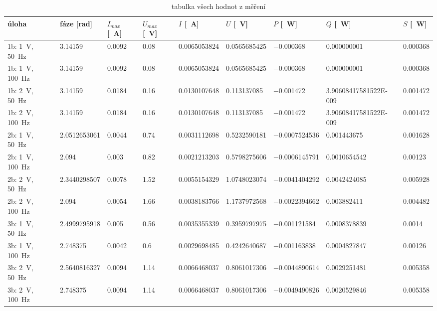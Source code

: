 \documentclass[a4paper]{article}
\begin{document}
\begin{table}[!ht]
	\centering
	\begin{tabular}{|l|l|l|l|l|l|l|l|l|}
		\hline
		úloha & fáze [rad] & $I_{max}$ [\SI{}{\ampere}] & $U_{max}$ [\SI{}{\volt}]& $I$ [\SI{}{\ampere}]& $U$ [\SI{}{\volt}]& $P$ [\SI{}{\watt}]&$ Q$ [\SI{}{\watt}]
		& $S$ [\SI{}{\watt}]\\ \hline
		1b: \SI{1}{\volt}, \SI{50}{\hertz}&\num{3.14159}&\num{0.0092}&\num{0.08}&\num{0.0065053824}&\num{0.0565685425}&\num{-0.000368}&\num{0.000000001}&\num{0.000368} \\ \hline
		1b: \SI{1}{\volt}, \SI{100}{\hertz}&\num{3.14159}&\num{0.0092}&\num{0.08}&\num{0.0065053824}&\num{0.0565685425}&\num{-0.000368}&\num{0.000000001}&\num{0.000368} \\ \hline
		1b: \SI{2}{\volt}, \SI{50}{\hertz}&\num{3.14159}&\num{0.0184}&\num{0.16}&\num{0.0130107648}&\num{0.113137085}&\num{-0.001472}&\num{3.90608417581522E-009}&\num{0.001472} \\ \hline
		1b: \SI{2}{\volt}, \SI{100}{\hertz}&\num{3.14159}&\num{0.0184}&\num{0.16}&\num{0.0130107648}&\num{0.113137085}&\num{-0.001472}&\num{3.90608417581522E-009}&\num{0.001472} \\ \hline
		2b: \SI{1}{\volt}, \SI{50}{\hertz}&\num{2.0512653061}&\num{0.0044}&\num{0.74}&\num{0.0031112698}&\num{0.5232590181}&\num{-0.0007524536}&\num{0.001443675}&\num{0.001628} \\ \hline
		2b: \SI{1}{\volt}, \SI{100}{\hertz}&\num{2.094}&\num{0.003}&\num{0.82}&\num{0.0021213203}&\num{0.5798275606}&\num{-0.0006145791}&\num{0.0010654542}&\num{0.00123} \\ \hline
		2b: \SI{2}{\volt}, \SI{50}{\hertz}&\num{2.3440298507}&\num{0.0078}&\num{1.52}&\num{0.0055154329}&\num{1.0748023074}&\num{-0.0041404292}&\num{0.0042424085}&\num{0.005928} \\ \hline
		2b: \SI{2}{\volt}, \SI{100}{\hertz}&\num{2.094}&\num{0.0054}&\num{1.66}&\num{0.0038183766}&\num{1.1737972568}&\num{-0.0022394662}&\num{0.003882411}&\num{0.004482} \\ \hline
		3b: \SI{1}{\volt}, \SI{50}{\hertz}&\num{2.4999795918}&\num{0.005}&\num{0.56}&\num{0.0035355339}&\num{0.3959797975}&\num{-0.001121584}&\num{0.0008378839}&\num{0.0014} \\ \hline
		3b: \SI{1}{\volt}, \SI{100}{\hertz}&\num{2.748375}&\num{0.0042}&\num{0.6}&\num{0.0029698485}&\num{0.4242640687}&\num{-0.001163838}&\num{0.0004827847}&\num{0.00126} \\ \hline
		3b: \SI{2}{\volt}, \SI{50}{\hertz}&\num{2.5640816327}&\num{0.0094}&\num{1.14}&\num{0.0066468037}&\num{0.8061017306}&\num{-0.0044890614}&\num{0.0029251481}&\num{0.005358} \\ \hline
		3b: \SI{2}{\volt}, \SI{100}{\hertz}&\num{2.748375}&\num{0.0094}&\num{1.14}&\num{0.0066468037}&\num{0.8061017306}&\num{-0.0049490826}&\num{0.0020529846}&\num{0.005358} \\ \hline
	\end{tabular}
	\caption{tabulka všech hodnot z měření}
\end{table}
\clearpage
\end{document}
